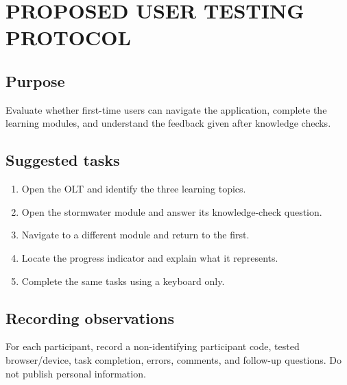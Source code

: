 \chapter{PROPOSED USER TESTING PROTOCOL}
\section{Purpose}
Evaluate whether first-time users can navigate the application, complete the learning modules, and understand the feedback given after knowledge checks.

\section{Suggested tasks}
\begin{enumerate}
 \item Open the OLT and identify the three learning topics.
 \item Open the stormwater module and answer its knowledge-check question.
 \item Navigate to a different module and return to the first.
 \item Locate the progress indicator and explain what it represents.
 \item Complete the same tasks using a keyboard only.
\end{enumerate}

\section{Recording observations}
For each participant, record a non-identifying participant code, tested browser/device, task completion, errors, comments, and follow-up questions. Do not publish personal information.
